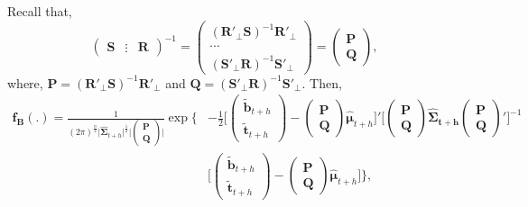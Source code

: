 \documentclass[a4paper, 11pt]{article}
\begin{document}
	Recall that,
	$$
	\begin{pmatrix}\bm{S} & \vdots& \bm{R}\end{pmatrix}^{-1} =
	\begin{pmatrix}(\bm{R}'_\bot \bm{S})^{-1}\bm{R}'_\bot \\ \cdots \\ (\bm{S}'_\bot \bm{R})^{-1}\bm{S}'_\bot \end{pmatrix} =
	\begin{pmatrix}
	\bm{P} \\\bm{Q}
	\end{pmatrix},
	$$
	where, $\bm{P}=(\bm{R}'_\bot \bm{S})^{-1}\bm{R}'_\bot$ and $\bm{Q}=(\bm{S}'_\bot \bm{R})^{-1}\bm{S}'_\bot$. Then,
	\begin{align*}
	\bm{f_B}(.)=\frac{1}{(2\pi)^{\frac{n}{2}}\Big|\bm{\hat{\Sigma}}_{t+h}\Big|^{\frac{1}{2}}\Big|\begin{pmatrix}\bm{P}\\\bm{Q}\end{pmatrix} \Big|}
	\exp \Big\{&-\frac{1}{2}\Big[\begin{pmatrix}\tilde{\bm{b}}_{t+h}\\ \tilde{\bm{t}}_{t+h}\end{pmatrix}-\begin{pmatrix}\bm{P}\\\bm{Q}\end{pmatrix}\bm{\hat{\mu}}_{t+h}\Big]'\Big[\begin{pmatrix}\bm{P}\\\bm{Q}\end{pmatrix}\bm{\hat{\Sigma}_{t+h}}\begin{pmatrix}\bm{P}\\\bm{Q}\end{pmatrix}'\Big]^{-1}\\
	&\Big[\begin{pmatrix}\tilde{\bm{b}}_{t+h}\\ \tilde{\bm{t}}_{t+h}\end{pmatrix}-\begin{pmatrix}\bm{P}\\\bm{Q}\end{pmatrix}\bm{\hat{\mu}}_{t+h}\Big] \Big\},
	\end{align*}
\end{document}
